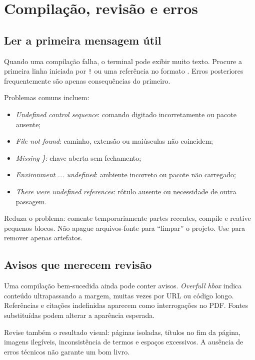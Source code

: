 \chapter{Compilação, revisão e erros}
\label{chap:erros}

\section{Ler a primeira mensagem útil}

Quando uma compilação falha, o terminal pode exibir muito texto. Procure a
primeira linha iniciada por \verb|!| ou uma referência no formato
. Erros posteriores frequentemente são apenas
consequências do primeiro.

Problemas comuns incluem:

\begin{itemize}
  \item \emph{Undefined control sequence}: comando digitado incorretamente ou
    pacote ausente;
  \item \emph{File not found}: caminho, extensão ou maiúsculas não coincidem;
  \item \emph{Missing \}}: chave aberta sem fechamento;
  \item \emph{Environment ... undefined}: ambiente incorreto ou pacote não
    carregado;
  \item \emph{There were undefined references}: rótulo ausente ou necessidade
    de outra passagem.
\end{itemize}

Reduza o problema: comente temporariamente partes recentes, compile e reative
pequenos blocos. Não apague arquivos-fonte para ``limpar'' o projeto. Use
 para remover apenas artefatos.

\section{Avisos que merecem revisão}

Uma compilação bem-sucedida ainda pode conter avisos. \emph{Overfull hbox}
indica conteúdo ultrapassando a margem, muitas vezes por URL ou código longo.
Referências e citações indefinidas aparecem como interrogações no PDF. Fontes
substituídas podem alterar a aparência esperada.

Revise também o resultado visual: páginas isoladas, títulos no fim da página,
imagens ilegíveis, inconsistência de termos e espaços excessivos. A ausência de
erros técnicos não garante um bom livro.

